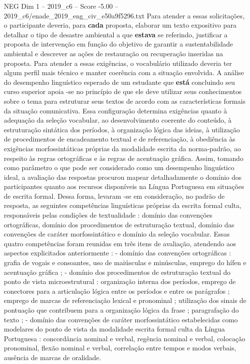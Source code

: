 \begin{textsample}{NEG Dim 1 – 2019\_c6 – Score -5.00 – 2019\_c6/enade\_2019\_eng\_civ\_e50a9f5296.txt}
Para atender a essas solicitações, o participante deveria, para \textbf{cada} proposta, elaborar um texto expositivo para detalhar o tipo de desastre ambiental a que \textbf{estava} se referindo, justificar a proposta de intervenção em função do objetivo de garantir a sustentabilidade ambiental e descrever as ações de restauração ou recuperação inseridas na proposta.
Para atender a essas exigências, o vocabulário utilizado deveria ter algum perfil mais técnico e manter coerência com a situação envolvida.
A análise do desempenho linguístico esperado de um estudante que \textbf{está} concluindo seu curso superior apoia -se no princípio de que ele deve utilizar seus conhecimentos sobre o tema para estruturar seus textos de acordo com as características formais da situação comunicativa.
Essa configuração determina exigências quanto à adequação da seleção vocabular, ao desenvolvimento coerente do conteúdo, à estruturação sintática dos períodos, à organização lógica das ideias, à utilização de procedimentos de encadeamento textual e de referenciação, à obediência às exigências morfossintáticas próprias da modalidade escrita da norma-padrão, ao respeito às regras ortográficas e às regras de acentuação gráfica.
Assim, tomando como parâmetro o que pode ser considerado como um desempenho linguístico ideal, a avaliação das respostas procurou mapear detalhadamente o domínio dos participantes quanto aos recursos disponíveis na Língua Portuguesa em situações de escrita formal.
Dessa forma, levaram -se em consideração, no padrão de resposta, as seguintes competências linguísticas próprias da escrita formal culta, responsáveis pelas condições de textualidade : domínio das convenções ortográficas, domínio dos procedimentos de estruturação textual, domínio das convenções de caráter morfossintático e domínio da seleção vocabular.
Essas quatro competências foram reunidas em três itens de avaliação, atendendo aos aspectos explicitados anteriormente : - domínio das convenções ortográficas : grafia de vogais e consoantes, uso de maiúsculas e minúsculas, emprego do hífen e acentuação gráfica ; - domínio dos procedimentos de estruturação textual do ponto de vista microestrutural : organização interna dos períodos, emprego de conectores para a articulação lógica entre os períodos e entre os parágrafos ; emprego de marcas de referenciação lexical e pronominal ; utilização dos sinais de pontuação que contribuem para a organização lógica da frase ; paragrafação do texto ; - domínio das convenções de caráter morfossintático estabelecidas como modelares do ponto de vista da modalidade escrita formal culta da Língua Portuguesa : concordância nominal e verbal, regência nominal e verbal, colocação pronominal, flexão nominal e verbal, correlação entre tempos e modos verbais, ausência de marcas de oralidade.

\end{textsample}
